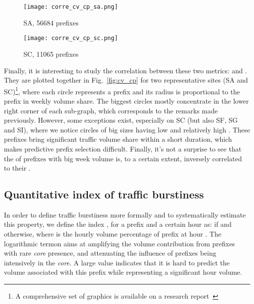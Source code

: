 \documentclass[10pt, conference,letterpaper]{IEEEtran}
\begin{document}
\begin{figure*}[!tb]
\centering
		\centering
        \begin{subfigure}[b]{0.49\textwidth}
        \centering
                \texttt{[image: corre\_cv\_cp\_sa.png]}
                \caption{SA, 56684 prefixes}
                \label{fig:cv_cp_sa}
        \end{subfigure}
        \hfill
\begin{subfigure}[b]{0.49\textwidth}
        \centering
                \texttt{[image: corre\_cv\_cp\_sc.png]}
                \caption{SC, 11065 prefixes}
                \label{fig:cv_cp_sc}
        \end{subfigure}
\caption{Relation between  and }  \label{fig:cv_cp}
\end{figure*}
Finally, it is interesting to study the correlation between these two metrics:  and . They are plotted  together in Fig.~\ref{fig:cv_cp} for two representative sites (SA and SC)\footnote{A comprehensive set of graphics is available on a research report~\cite{RR}}, where each circle represents a prefix and its radius is proportional to the prefix in weekly volume share.
The biggest circles mostly concentrate in the lower right corner of each sub-graph, which corresponds to the remarks made previously.
However, some exceptions exist, especially on SC (but also SF, SG and SI), where we notice circles of big sizes having low  and relatively high .
These prefixes bring significant traffic volume share within a short duration, which makes predictive prefix selection difficult. 
Finally, it's not a surprise to see that the  of prefixes with big week volume is, to a certain extent, inversely correlated to their . 


\subsection{Quantitative index of traffic burstiness}

In order to define traffic burstiness more formally and to systematically estimate this property, we define 
the index , for a prefix  and  a certain hour  as:
 if  and  otherwise, where  is the hourly volume percentage of prefix  at hour .
The logarithmic termon  aims at amplifying the volume contribution from prefixes with rare \textit{core} presence, and attenuating the influence of prefixes being intensively in the \textit{core}.
A large  value indicates that it is hard to predict the volume associated with this prefix while representing a significant hour volume.
\end{document}
